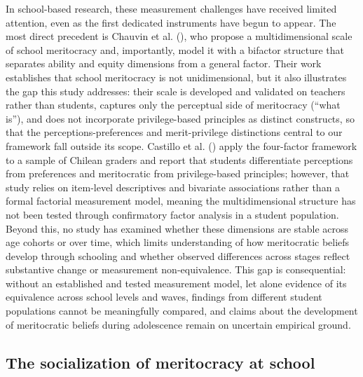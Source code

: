 \documentclass[
  13pt,
]{article}
\begin{document}
In school-based research, these measurement challenges have received
limited attention, even as the first dedicated instruments have begun to
appear. The most direct precedent is Chauvin et al.
(), who propose a
multidimensional scale of school meritocracy and, importantly, model it
with a bifactor structure that separates ability and equity dimensions
from a general factor. Their work establishes that school meritocracy is
not unidimensional, but it also illustrates the gap this study
addresses: their scale is developed and validated on teachers rather
than students, captures only the perceptual side of meritocracy (``what
is''), and does not incorporate privilege-based principles as distinct
constructs, so that the perceptions-preferences and merit-privilege
distinctions central to our framework fall outside its scope. Castillo
et al. () apply the
four-factor framework to a sample of Chilean graders and report that
students differentiate perceptions from preferences and meritocratic
from privilege-based principles; however, that study relies on
item-level descriptives and bivariate associations rather than a formal
factorial measurement model, meaning the multidimensional structure has
not been tested through confirmatory factor analysis in a student
population. Beyond this, no study has examined whether these dimensions
are stable across age cohorts or over time, which limits understanding
of how meritocratic beliefs develop through schooling and whether
observed differences across stages reflect substantive change or
measurement non-equivalence. This gap is consequential: without an
established and tested measurement model, let alone evidence of its
equivalence across school levels and waves, findings from different
student populations cannot be meaningfully compared, and claims about
the development of meritocratic beliefs during adolescence remain on
uncertain empirical ground.

\subsection{The socialization of meritocracy at
school}\label{the-socialization-of-meritocracy-at-school}
\end{document}
